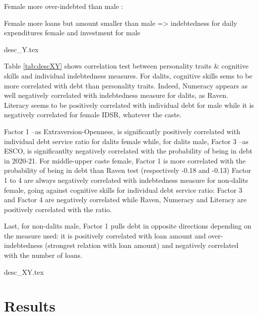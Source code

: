 \documentclass[a4paper, 11pt, onecolumn]{article}
\begin{document}
Female more over-indebted than male :

Female more loans but amount smaller than male => indebtedness for daily expenditures female and investment for male

{desc_Y.tex}

Table \ref{tab:descXY} shows correlation test between personality traits \& cognitive skills and individual indebtedness measures.
For dalits, cognitive skills sems to be more correlated with debt than personality traits.
Indeed, Numeracy appears as well negatively correlated with indebtedness measure for dalits, as Raven.
Literacy seems to be positively correlated with individual debt for male while it is negatively correlated for female IDSR, whatever the caste.

Factor 1 --as Extraversion-Openness, is significantly positively correlated with individual debt service ratio for dalits female while, for dalits male, Factor 3 --as ESCO, is significantlty negatively correlated with the probability of being in debt in 2020-21.
For middle-upper caste female, Factor 1 is more correlated with the probability of being in debt than Raven test (respectively -0.18 and -0.13) 
Factor 1 to 4 are always negatively correlated with indebtedness measure for non-dalits female, going against cognitive skills for individual debt service ratio: Factor 3 and Factor 4 are negatively correlated while Raven, Numeracy and Literacy are positively correlated with the ratio.

Last, for non-dalits male, Factor 1 pulls debt in opposite directions depending on the measure used: it is positively correlated with loan amount and over-indebtedness (strongest relation with loan amount) and negatively correlated with the number of loans.


{desc_XY.tex}




\newpage
\section{Results}
\end{document}
